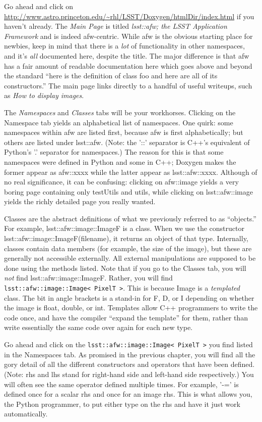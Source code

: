\documentclass{book}
\begin{document}
Go ahead and click on
\url{http://www.astro.princeton.edu/~rhl/LSST/Doxygen/htmlDir/index.html}
if you haven't already.  The {\it Main Page} is titled {\it lsst::afw; the
LSST Application Framework} and is indeed afw-centric.  While afw is
the obvious starting place for newbies, keep in mind that there is a
{\it lot} of functionality in other namespaces, and it's {\it all}
documented here, despite the title.  The major difference is that afw
has a fair amount of readable documentation here which goes above and
beyond the standard ``here is the definition of class foo and here are
all of its constructors.''  The main page links directly to a handful
of useful writeups, such as {\it How to display images}.

The {\it Namespaces} and {\it Classes} tabs will be your workhorses.
Clicking on the Namespace tab yields an alphabetical list of
namespaces.  One quirk: some namespaces within afw are listed first,
because afw is first alphabetically; but others are listed under
lsst::afw. (Note: the '::' separator is C++'s equivalent of Python's
'.' separator for namespaces.)  The reason for this is that some
namespaces were defined in Python and some in C++; Doxygen makes the
former appear as afw::xxxx while the latter appear as lsst::afw::xxxx.
Although of no real significance, it can be confusing: clicking on
afw::image yields a very boring page containing only testUtils and
utils, while clicking on lsst::afw::image yields the richly detailed
page you really wanted.  

Classes are the abstract definitions of what we previously referred to
as ``objects.'' For example, lsst::afw::image::ImageF is a class.
When we use the constructor lsst::afw::image::ImageF(filename), it
returns an object of that type.  Internally, classes contain data
members (for example, the size of the image), but these are generally
not accessible externally.  All external manipulations are supposed to
be done using the methods listed.  Note that if you go to the Classes
tab, you will {\it not} find lsst::afw::image::ImageF. Rather, you
will find \texttt{lsst::afw::image::Image< PixelT >}.  This is
because Image is a {\it templated} class.  The bit in angle brackets
is a stand-in for F, D, or I depending on whether the image is float,
double, or int.  Templates allow C++ programmers to write the code
once, and have the compiler ``expand the template'' for them, rather
than write essentially the same code over again for each new type.

Go ahead and click on the \texttt{lsst::afw::image::Image< PixelT >}
you find listed in the Namespaces tab.  As promised in the previous
chapter, you will find all the gory detail of all the different
constructors and operators that have been defined.  (Note: rhs and lhs
stand for right-hand side and left-hand side respectively.)  You will
often see the same operator defined multiple times.  For example, '-='
is defined once for a scalar rhs and once for an image rhs.  This is
what allows you, the Python programmer, to put either type on the rhs
and have it just work automatically.
\end{document}

